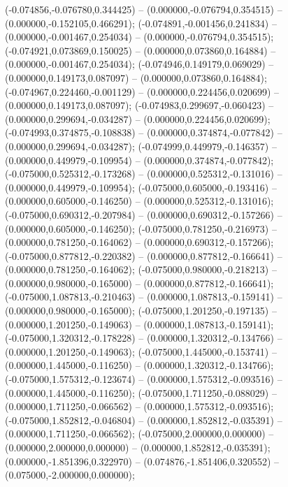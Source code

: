  (-0.074856,-0.076780,0.344425) -- (0.000000,-0.076794,0.354515) -- (0.000000,-0.152105,0.466291);
 (-0.074891,-0.001456,0.241834) -- (0.000000,-0.001467,0.254034) -- (0.000000,-0.076794,0.354515);
 (-0.074921,0.073869,0.150025) -- (0.000000,0.073860,0.164884) -- (0.000000,-0.001467,0.254034);
 (-0.074946,0.149179,0.069029) -- (0.000000,0.149173,0.087097) -- (0.000000,0.073860,0.164884);
 (-0.074967,0.224460,-0.001129) -- (0.000000,0.224456,0.020699) -- (0.000000,0.149173,0.087097);
 (-0.074983,0.299697,-0.060423) -- (0.000000,0.299694,-0.034287) -- (0.000000,0.224456,0.020699);
 (-0.074993,0.374875,-0.108838) -- (0.000000,0.374874,-0.077842) -- (0.000000,0.299694,-0.034287);
 (-0.074999,0.449979,-0.146357) -- (0.000000,0.449979,-0.109954) -- (0.000000,0.374874,-0.077842);
 (-0.075000,0.525312,-0.173268) -- (0.000000,0.525312,-0.131016) -- (0.000000,0.449979,-0.109954);
 (-0.075000,0.605000,-0.193416) -- (0.000000,0.605000,-0.146250) -- (0.000000,0.525312,-0.131016);
 (-0.075000,0.690312,-0.207984) -- (0.000000,0.690312,-0.157266) -- (0.000000,0.605000,-0.146250);
 (-0.075000,0.781250,-0.216973) -- (0.000000,0.781250,-0.164062) -- (0.000000,0.690312,-0.157266);
 (-0.075000,0.877812,-0.220382) -- (0.000000,0.877812,-0.166641) -- (0.000000,0.781250,-0.164062);
 (-0.075000,0.980000,-0.218213) -- (0.000000,0.980000,-0.165000) -- (0.000000,0.877812,-0.166641);
 (-0.075000,1.087813,-0.210463) -- (0.000000,1.087813,-0.159141) -- (0.000000,0.980000,-0.165000);
 (-0.075000,1.201250,-0.197135) -- (0.000000,1.201250,-0.149063) -- (0.000000,1.087813,-0.159141);
 (-0.075000,1.320312,-0.178228) -- (0.000000,1.320312,-0.134766) -- (0.000000,1.201250,-0.149063);
 (-0.075000,1.445000,-0.153741) -- (0.000000,1.445000,-0.116250) -- (0.000000,1.320312,-0.134766);
 (-0.075000,1.575312,-0.123674) -- (0.000000,1.575312,-0.093516) -- (0.000000,1.445000,-0.116250);
 (-0.075000,1.711250,-0.088029) -- (0.000000,1.711250,-0.066562) -- (0.000000,1.575312,-0.093516);
 (-0.075000,1.852812,-0.046804) -- (0.000000,1.852812,-0.035391) -- (0.000000,1.711250,-0.066562);
 (-0.075000,2.000000,0.000000) -- (0.000000,2.000000,0.000000) -- (0.000000,1.852812,-0.035391);
 (0.000000,-1.851396,0.322970) -- (0.074876,-1.851406,0.320552) -- (0.075000,-2.000000,0.000000);
